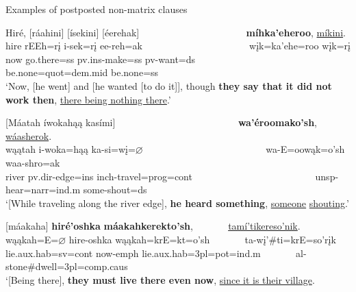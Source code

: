 \largerpage
\begin{exe}
    \item\label{Ch5PostposedClauses} Examples of postposted non-matrix clauses

    \begin{xlist}
        \item\label{Ch5PostposedClausesA} \glll Hiré, \textnormal{[}ráahini\textnormal{]} \textnormal{[}ísekini\textnormal{]} \textnormal{[}éerehak\textnormal{]} ~ ~ ~ ~ ~ ~ ~ ~ ~ ~ ~ ~ ~  \textbf{míhka'eheroo}, \uline{míkini}.\\
        hire rEEh=rį i-sek=rį ee-reh=ak ~ ~ ~ ~ ~ ~ ~ ~ ~ ~ ~ ~ ~ wįk=ka'ehe=roo wįk=rį\\
        \textnormal{now} \textnormal{go.there}=ss pv.ins-\textnormal{make}=ss pv-\textnormal{want}=ds ~ ~ ~ ~ ~ ~ ~ ~ ~ ~ ~ ~ ~ \textnormal{be.none}=quot=dem.mid \textnormal{be.none}=ss\\
        \glt `Now, [he went] and [he wanted [to do it]], though \textbf{they say that it did not work then}, \uline{there being nothing there}.' \citep[17]{hollow1973a}

        \item\label{Ch5PostposedClausesB} \glll \textnormal{[}Máatah íwokahąą kasími\textnormal{]} ~ ~ ~ ~ ~ ~ ~ ~ ~ ~ ~ ~ ~ ~ ~ \textbf{wa'éroomako'sh}, \uline{wáasherok}.\\
        wąątah i-woka=hąą ka-si=wį=$\varnothing$ ~ ~ ~ ~ ~ ~ ~ ~ ~ ~ ~ ~ ~ ~ ~ wa-E=oowąk=o'sh waa-shro=ak\\
        \textnormal{river} pv.dir-\textnormal{edge}=ins inch-\textnormal{travel}=prog=cont ~ ~ ~ ~ ~ ~ ~ ~ ~ ~ ~ ~ ~ ~ ~ unsp-\textnormal{hear}=narr=ind.m \textnormal{some}-\textnormal{shout}=ds\\
        \glt `[While traveling along the river edge], \textbf{he heard something}, \uline{someone} \uline{shouting}.' \citep[28]{hollow1973a}

        \item\label{Ch5PostposedClausesC} \glll \textnormal{[}máakaha\textnormal{]} \textbf{hiré'oshka} \textbf{máakahkerekto'sh}, ~ ~ ~ ~ \uline{tamí'tikereso'nik}.\\
        wąąkah=E=$\varnothing$ hire-oshka wąąkah=krE=kt=o'sh ~ ~ ~ ~ ta-wį'\#ti=krE=so'rįk\\
        \textnormal{lie}.aux.hab=sv=cont \textnormal{now}-emph \textnormal{lie}.aux.hab=3pl=pot=ind.m ~ ~ ~ ~ al-\textnormal{stone}\#\textnormal{dwell}=3pl=comp.caus\\
        \glt `[Being there], \textbf{they must live there even now}, \uline{since it is their village}. \citep[91]{hollow1973b}
        
    \end{xlist}
\end{exe}

